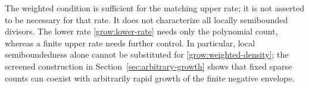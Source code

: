 The weighted condition is sufficient for the matching upper rate;
it is not asserted to be necessary for that rate. It does not
characterize all locally semibounded divisors.
The lower rate \eqref{grow:lower-rate} needs only the polynomial
count, whereas a finite upper rate needs further control. In
particular, local semiboundedness alone cannot be substituted for
\eqref{grow:weighted-density}; the screened construction in
Section~\ref{sec:arbitrary-growth} shows that fixed sparse counts can coexist with
arbitrarily rapid growth of the finite negative envelope.
